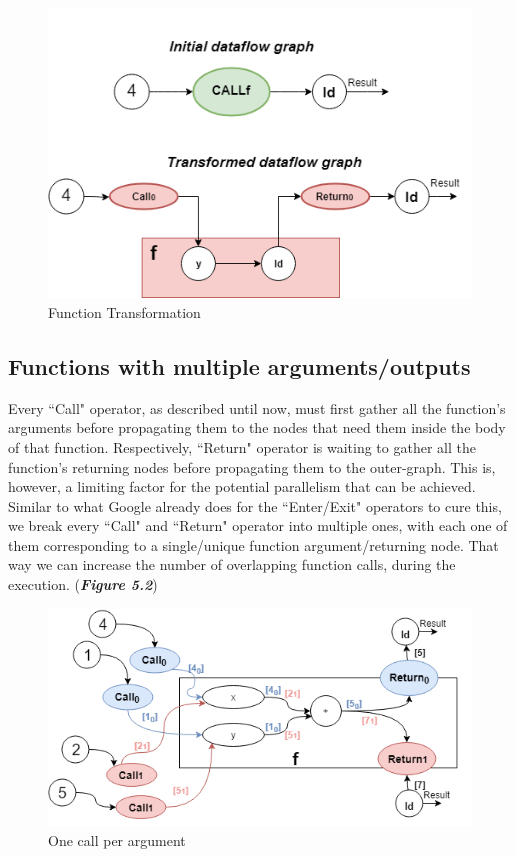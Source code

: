 \documentclass[ack,preface]{dithesis}
\begin{document}
\begin{figure}
\centering
\includegraphics[scale=0.65]{figures/transformation}
\caption{Function Transformation}
\end{figure}

    \subsection{Functions with multiple arguments/outputs}

Every ``Call" operator, as described until now, must first gather all the function's arguments before propagating them to the nodes that need them inside the body of that function. Respectively, ``Return" operator is waiting to gather all the function's returning nodes before propagating them to the outer-graph. This is, however, a limiting factor for the potential parallelism that can be achieved. Similar to what Google already does for the ``Enter/Exit" operators to cure this, we break every ``Call" and ``Return" operator into multiple ones, with each one of them corresponding to a single/unique function argument/returning node. That way we can increase the number of overlapping function calls, during the execution. (\textit{\textbf{Figure 5.2}})

\begin{figure}[h]
\centering
\includegraphics[scale=0.62]{figures/breakops}
\caption{One call per argument}
\end{figure}
\end{document}
